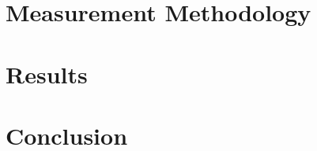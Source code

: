 \documentclass[12pt]{article}
\begin{document}
\pagebreak

\section{Measurement Methodology}

\section{Results}

\begin{figure}
    
\end{figure}


\section{Conclusion}



\pagebreak

\begin{thebibliography}{99}
\end{thebibliography}
\end{document}
